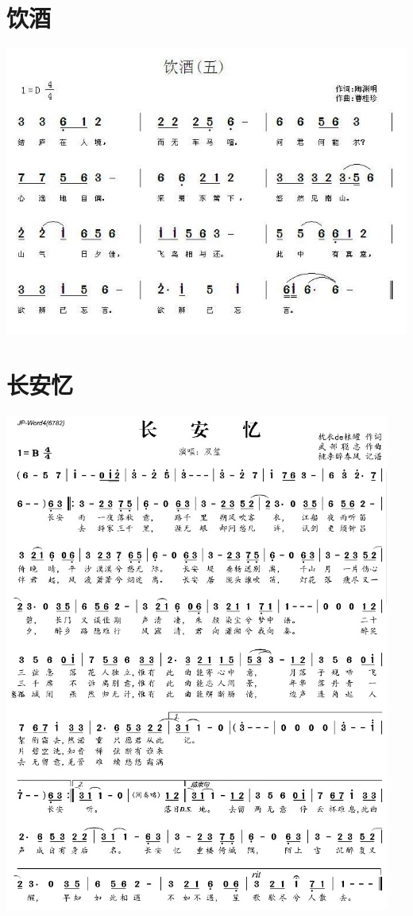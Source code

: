 \documentclass[cn,pad,twocol]{elegantbook}
\begin{document}
\section{饮酒}                  \includegraphics[width=\textwidth]{dongxiao/20200808-饮酒-陶渊明.jpg}
\section{长安忆}                \includegraphics[width=0.95\textwidth]{rpi400/20210123-长安忆.jpg}
\end{document}
